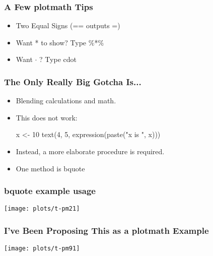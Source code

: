 \documentclass[11pt,english]{beamer}
\begin{document}

\begin{frame}
  \frametitle{A Few plotmath Tips}
  \begin{itemize}
    \item Two Equal Signs (== outputs =)
    \item Want * to show? Type \%*\%
    \item Want $\cdot$ ? Type  cdot

  \end{itemize}
\end{frame}


\begin{frame}[containsverbatim]
  \frametitle{The Only Really Big Gotcha Is...}

  \begin{itemize}
  \item Blending calculations and math.
  \item This does not work:
\begin{Sinput}
x <- 10
text(4, 5, expression(paste("x is ", x)))
\end{Sinput}

  \item Instead, a more elaborate procedure is required.
  \item One method is bquote


  \end{itemize}
\end{frame}


\begin{frame}
  \frametitle{bquote example usage}




\end{frame}


\begin{frame}[containsverbatim]


\texttt{[image: plots/t-pm21]}

\end{frame}

\begin{frame}
  \frametitle{I've Been Proposing This as a plotmath Example}

















\texttt{[image: plots/t-pm91]}

\end{frame}
\end{document}
